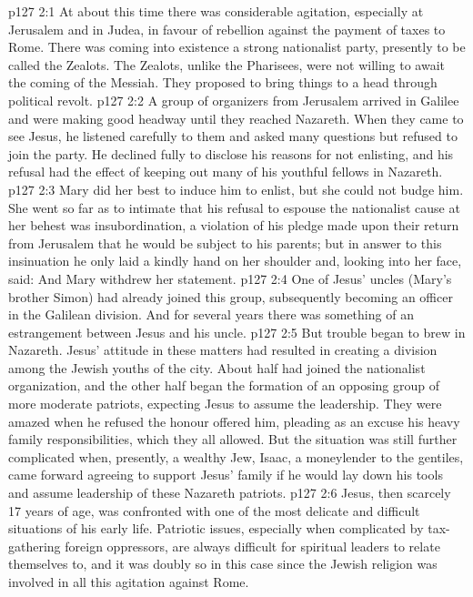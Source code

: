 \vs p127 2:1 At about this time there was considerable agitation, especially at Jerusalem and in Judea, in favour of rebellion against the payment of taxes to Rome. There was coming into existence a strong nationalist party, presently to be called the Zealots. The Zealots, unlike the Pharisees, were not willing to await the coming of the Messiah. They proposed to bring things to a head through political revolt.
\vs p127 2:2 A group of organizers from Jerusalem arrived in Galilee and were making good headway until they reached Nazareth. When they came to see Jesus, he listened carefully to them and asked many questions but refused to join the party. He declined fully to disclose his reasons for not enlisting, and his refusal had the effect of keeping out many of his youthful fellows in Nazareth.
\vs p127 2:3 Mary did her best to induce him to enlist, but she could not budge him. She went so far as to intimate that his refusal to espouse the nationalist cause at her behest was insubordination, a violation of his pledge made upon their return from Jerusalem that he would be subject to his parents; but in answer to this insinuation he only laid a kindly hand on her shoulder and, looking into her face, said:  And Mary withdrew her statement.
\vs p127 2:4 One of Jesus’ uncles (Mary’s brother Simon) had already joined this group, subsequently becoming an officer in the Galilean division. And for several years there was something of an estrangement between Jesus and his uncle.
\vs p127 2:5 But trouble began to brew in Nazareth. Jesus’ attitude in these matters had resulted in creating a division among the Jewish youths of the city. About half had joined the nationalist organization, and the other half began the formation of an opposing group of more moderate patriots, expecting Jesus to assume the leadership. They were amazed when he refused the honour offered him, pleading as an excuse his heavy family responsibilities, which they all allowed. But the situation was still further complicated when, presently, a wealthy Jew, Isaac, a moneylender to the gentiles, came forward agreeing to support Jesus’ family if he would lay down his tools and assume leadership of these Nazareth patriots.
\vs p127 2:6 Jesus, then scarcely 17 years of age, was confronted with one of the most delicate and difficult situations of his early life. Patriotic issues, especially when complicated by tax\hyp{}gathering foreign oppressors, are always difficult for spiritual leaders to relate themselves to, and it was doubly so in this case since the Jewish religion was involved in all this agitation against Rome.
